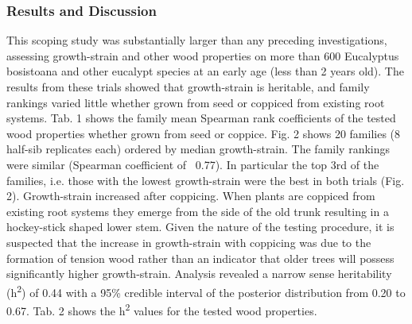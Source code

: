 \subsubsection*{Results and Discussion}
This scoping study was substantially larger than any preceding investigations, assessing growth-strain and other wood properties on more than 600 Eucalyptus bosistoana and other eucalypt species at an early age (less than 2 years old). The results from these trials showed that growth-strain is heritable, and family rankings varied little whether grown from seed or coppiced from existing root systems. Tab. 1 shows the family mean Spearman rank coefficients of the tested wood properties whether grown from seed or coppice. Fig. 2 shows 20 families (8 half-sib replicates each) ordered by median growth-strain. The family rankings were similar (Spearman coefficient of ~0.77). In particular the top 3rd of the families, i.e. those with the lowest growth-strain were the best in both trials (Fig. 2). Growth-strain increased after coppicing. When plants are coppiced from existing root systems they emerge from the side of the old trunk resulting in a hockey-stick shaped lower stem. Given the nature of the testing procedure, it is suspected that the increase in growth-strain with coppicing was due to the formation of tension wood rather than an indicator that older trees will possess significantly higher growth-strain. Analysis revealed a narrow sense heritability (h\textsuperscript{2}) of 0.44 with a 95\% credible interval of the posterior distribution from 0.20 to 0.67. Tab. 2 shows the h\textsuperscript{2} values for the tested wood properties.
